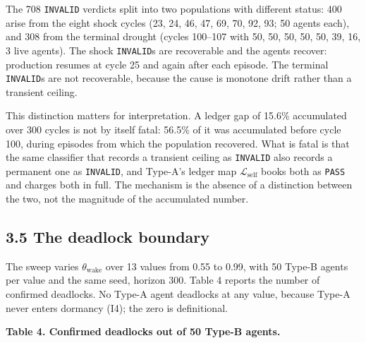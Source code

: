 \documentclass[11pt,a4paper]{article}
\begin{document}
The 708 \texttt{INVALID} verdicts split into two populations with different status:
400 arise from the eight shock cycles (23, 24, 46, 47, 69, 70, 92, 93; 50 agents
each), and 308 from the terminal drought (cycles 100--107 with 50, 50, 50, 50, 50,
39, 16, 3 live agents). The shock \texttt{INVALID}s are recoverable and the agents
recover: production resumes at cycle 25 and again after each episode. The terminal
\texttt{INVALID}s are not recoverable, because the cause is monotone drift rather than a
transient ceiling.

This distinction matters for interpretation. A ledger gap of 15.6\% accumulated
over 300 cycles is not by itself fatal: 56.5\% of it was accumulated before cycle
100, during episodes from which the population recovered. What is fatal is that
the same classifier that records a transient ceiling as \texttt{INVALID} also records a
permanent one as \texttt{INVALID}, and Type-A's ledger map
\(\mathcal{L}_{\mathrm{self}}\) books both as \texttt{PASS} and charges both in full. The
mechanism is the absence of a distinction between the two, not the magnitude of
the accumulated number.

\subsection{3.5 The deadlock boundary}\label{the-deadlock-boundary}

The sweep varies \(\theta_{\mathrm{wake}}\) over 13 values from 0.55 to 0.99, with
50 Type-B agents per value and the same seed, horizon 300. Table 4 reports the
number of confirmed deadlocks. No Type-A agent deadlocks at any value, because
Type-A never enters dormancy (I4); the zero is definitional.

\textbf{Table 4. Confirmed deadlocks out of 50 Type-B agents.}
\end{document}
